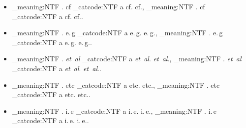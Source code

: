\documentclass{scrartcl}
\makeatletter
\newcommand\latinabbrev[1]{
  \peek_meaning:NTF . {%
    #1\@}{%
  \peek_catcode:NTF a {%
    #1.\@}{%
  #1.\@}}}
\def\cf/{\latinabbrev{cf}}
\def\eg/{\latinabbrev{e.\,g}}
\def\etal/{\latinabbrev{\textit{et~al}}}
\def\etc/{\latinabbrev{etc}}
\def\ie/{\latinabbrev{i.\,e}}
\makeatother
\begin{document}
\begin{itemize}
	\item \cf/, \cf/.
	\item \eg/, \eg/.
	\item \etal/, \etal/.
	\item \etc/, \etc/.
	\item \ie/, \ie/.
\end{itemize}
\end{document}
